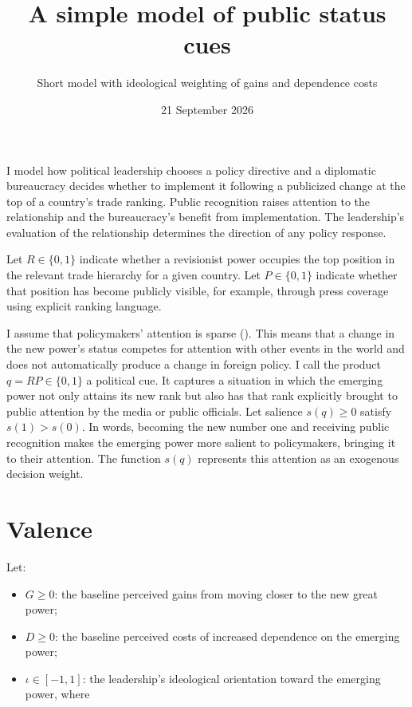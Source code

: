 \documentclass[
  11pt,
]{article}
\title{A simple model of public status cues}
\subtitle{Short model with ideological weighting of gains and dependence
costs}
\author{}
\date{\vspace{-2.5em}21 September 2026}
\providecommand{\tightlist}{%
  \setlength{\itemsep}{0pt}\setlength{\parskip}{0pt}}
\theoremstyle{definition}
\begin{document}
\maketitle

I model how political leadership chooses a policy directive and a
diplomatic bureaucracy decides whether to implement it following a
publicized change at the top of a country's trade ranking. Public
recognition raises attention to the relationship and the bureaucracy's
benefit from implementation. The leadership's evaluation of the
relationship determines the direction of any policy response.

Let \(R\in\{0,1\}\) indicate whether a revisionist power occupies the
top position in the relevant trade hierarchy for a given country. Let
\(P\in\{0,1\}\) indicate whether that position has become publicly
visible, for example, through press coverage using explicit ranking
language.

I assume that policymakers' attention is sparse
(). This means that a change in
the new power's status competes for attention with other events in the
world and does not automatically produce a change in foreign policy. I
call the product \(q=RP\in\{0,1\}\) a political cue. It captures a
situation in which the emerging power not only attains its new rank but
also has that rank explicitly brought to public attention by the media
or public officials. Let salience \(s(q)\geq0\) satisfy \(s(1)>s(0)\).
In words, becoming the new number one and receiving public recognition
makes the emerging power more salient to policymakers, bringing it to
their attention. The function \(s(q)\) represents this attention as an
exogenous decision weight.

\section{Valence}\label{valence}

Let:

\begin{itemize}
\tightlist
\item
  \(G\geq0\): the baseline perceived gains from moving closer to the new
  great power;
\item
  \(D\geq0\): the baseline perceived costs of increased dependence on
  the emerging power;
\item
  \(\iota\in[-1,1]\): the leadership's ideological orientation toward
  the emerging power, where
\end{itemize}
\end{document}
